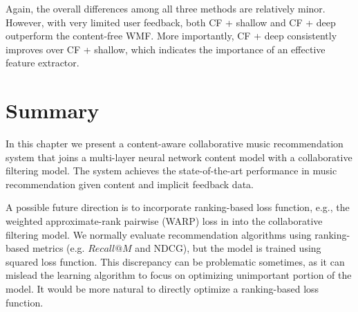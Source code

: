 Again, the overall differences among all three methods are relatively minor. However, with very limited user feedback, both CF + shallow and CF + deep outperform the content-free \gls{WMF}. More importantly, CF + deep consistently improves over CF + shallow, which indicates the importance of an effective feature extractor.  


\section{Summary}
In this chapter we present a content-aware collaborative music recommendation system that joins a multi-layer neural network content model with a collaborative filtering model. The system achieves the state-of-the-art performance in music recommendation given content and implicit feedback data. 


A possible future direction is to incorporate ranking-based loss function, e.g., the weighted approximate-rank pairwise (WARP) loss in \citet{weston2011wsabie} into the collaborative filtering model. We normally evaluate recommendation algorithms using ranking-based metrics (e.g. $Recall@M$ and NDCG), but the model is trained using squared loss function. This discrepancy can be problematic sometimes, as it can mislead the learning algorithm to focus on optimizing unimportant portion of the model. It would be more natural to directly optimize a ranking-based loss function.  
